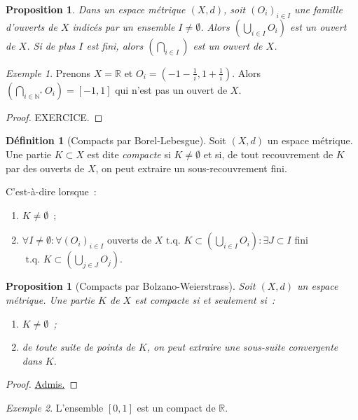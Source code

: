 \documentclass{report}
\newtheorem{prp}[thm]{Proposition}
\theoremstyle{definition}
\newtheorem{déf}[thm]{Définition}
\theoremstyle{remark}
\newtheorem{ex}{Exemple}[chapter]
\numberwithin{equation}{section}
\newcommand{\R}{\mathbb R}
\newcommand{\N}{\mathbb N}
\newcommand{\Ns}{\N^{*}}
\newcommand{\tq}{\text{ t.q. }}
\newcommand{\seq}[3]{\left(#1_{#2}\right)_{#2 \in #3}}
\newcommand{\grantedproof}{\begin{proof} \underline{Admis.} \end{proof}}
\begin{document}
				\begin{prp} Dans un espace métrique $(X, d)$, soit $\seq OiI$ une famille d'ouverts de $X$ indicés par un ensemble $I \neq \emptyset$.
				Alors $\left(\bigcup_{i \in I}O_i\right)$ est un ouvert de $X$. Si de plus $I$ est fini, alors $\left(\bigcap_{i \in I}\right)$ est
				un ouvert de $X$. \end{prp}

				\begin{ex} Prenons $X = \R$ et $O_i = (-1-\frac 1i, 1 + \frac 1i)$. Alors $\left(\bigcap_{i \in \Ns}O_i\right) = [-1, 1]$ qui n'est pas
				un ouvert de $X$. \end{ex}

				\begin{proof} EXERCICE.
				\end{proof}

				\begin{déf}[Compacts par Borel-Lebesgue] Soit $(X, d)$ un espace métrique. Une partie $K \subset X$ est dite \textit{compacte} si
				$K \neq \emptyset$ et si, de tout recouvrement de $K$ par des ouverts de $X$, on peut extraire un sous-recouvrement fini.

				C'est-à-dire lorsque~:
				\begin{enumerate}
					\item $K \neq \emptyset$~;
					\item $\forall I \neq \emptyset : \forall \seq OiI$ ouverts de $X \tq K \subset \left(\bigcup_{i \in I}O_i\right) : \exists J \subset I$
						  fini $\tq K \subset \left(\bigcup_{j \in J}O_j\right)$.
				\end{enumerate}
				\end{déf}

				\begin{prp}[Compacts par Bolzano-Weierstrass] Soit $(X, d)$ un espace métrique. Une partie $K$ de $X$ est compacte si et seulement si~:

				\begin{enumerate}
					\item $K \neq \emptyset$~;
					\item de toute suite de points de $K$, on peut extraire une sous-suite convergente dans $K$.
				\end{enumerate}
				\end{prp}

				\grantedproof

				\begin{ex} L'ensemble $[0, 1]$ est un compact de $\R$. \end{ex}
\end{document}
